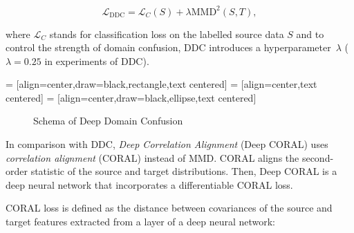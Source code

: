 \begin{equation}
	\mathcal{L}_{\mathrm{DDC}} = \mathcal{L}_C(S)
	+ \lambda \mathrm{MMD}^2(S, T),
	\label{ddc_loss}
\end{equation}

where \(\mathcal{L}_C\) stands for classification loss on the labelled source data \(S\) and to control the strength of domain confusion,
DDC introduces a hyperparameter~\(\lambda\)
(\(\lambda = 0.25\) in experiments of DDC).

 = [align=center,draw=black,rectangle,text centered]
 = [align=center,text centered]
 = [align=center,draw=black,ellipse,text centered]
\begin{figure}
\begin{center}
\end{center}
\caption{Schema of Deep Domain Confusion}
\end{figure}

In comparison with DDC, \textit{Deep Correlation Alignment} (Deep CORAL) uses \textit{correlation alignment} (CORAL) instead of MMD.
CORAL aligns the second-order statistic of the source and target distributions.
Then, Deep CORAL is a deep neural network
that incorporates a differentiable CORAL loss.

CORAL loss is defined as the distance between covariances of the source and target features extracted from a layer of a deep neural network:

